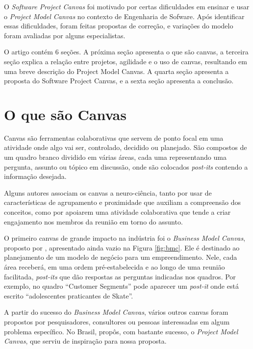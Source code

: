 \documentclass{article}
\begin{document}
O \textit{Software Project Canvas} foi motivado por certas dificuldades em ensinar e usar o \textit{Project Model Canvas} no contexto de Engenharia de Sofware. Após identificar essas dificuldades, foram feitas propostas de correção, e variações do modelo foram avaliadas por alguns especialistas.

O artigo contém 6 seções. A próxima seção apresenta o que são canvas, a terceira seção explica a relação entre projetos, agilidade e o uso de canvas, resultando em uma breve descrição do Project Model Canvas. A quarta seção apresenta a proposta do Software Project Canvas, e a sexta seção apresenta a conclusão.

\section{O que são Canvas}

Canvas são ferramentas colaborativas que servem de ponto focal em uma atividade onde algo vai ser, controlado, decidido ou planejado. São compostos de um quadro branco dividido em várias áreas, cada uma representando uma pergunta, assunto ou tópico em discussão, onde são colocados \textit{post-its} contendo a informação desejada. 

Alguns autores\citep{finocchio:2013} associam os canvas a neuro-ciência, tanto por usar de características de agrupamento e proximidade que auxiliam a compreensão dos conceitos, como por apoiarem uma atividade colaborativa que tende a criar engajamento nos membros da reunião em torno do assunto.

O primeiro canvas de grande impacto na indústria foi o \textit{Business Model Canvas}, proposto por \citet{osterwalder2010business}, apresentado ainda vazio na Figura \ref{fig:bmc}. Ele é destinado ao planejamento de um modelo de negócio para um empreendimento. Nele, cada área receberá, em uma ordem pré-estabelecida e ao longo de uma reunião facilitada, \textit{post-its} que dão respostas as perguntas indicadas nos quadros. Por exemplo, no quadro ``Customer Segments'' pode aparecer um \textit{post-it} onde está escrito ``adolescentes praticantes de Skate''.

A partir do sucesso do \textit{Business Model Canvas}, vários outros canvas foram propostos por pesquisadores, consultores ou pessoas interessadas em algum problema específico. No Brasil, \citeauthor{finocchio:2013} propôs, com bastante sucesso, o \textit{Project Model Canvas}\citep{finocchio:2013}, que serviu de inspiração para nossa proposta. 
\end{document}
